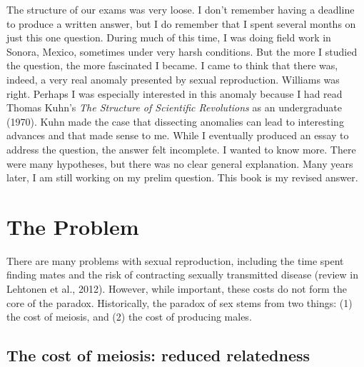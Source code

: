 \documentclass[
  letterpaper,
]{book}
\begin{document}
The structure of our exams was very loose. I don't remember having a
deadline to produce a written answer, but I do remember that I spent
several months on just this one question. During much of this time, I
was doing field work in Sonora, Mexico, sometimes under very harsh
conditions. But the more I studied the question, the more fascinated I
became. I came to think that there was, indeed, a very real anomaly
presented by sexual reproduction. Williams was right. Perhaps I was
especially interested in this anomaly because I had read Thomas Kuhn's
\emph{The Structure of Scientific Revolutions} as an undergraduate
(1970). Kuhn made the case that dissecting anomalies can lead to
interesting advances and that made sense to me. While I eventually
produced an essay to address the question, the answer felt incomplete. I
wanted to know more. There were many hypotheses, but there was no clear
general explanation. Many years later, I am still working on my prelim
question. This book is my revised answer.

\hypertarget{the-problem}{%
\section{The Problem}\label{the-problem}}

There are many problems with sexual reproduction, including the time
spent finding mates and the risk of contracting sexually transmitted
disease (review in Lehtonen et al., 2012). However, while important,
these costs do not form the core of the paradox. Historically, the
paradox of sex stems from two things: (1) the cost of meiosis, and (2)
the cost of producing males.

\hypertarget{the-cost-of-meiosis-reduced-relatedness}{%
\subsection{The cost of meiosis: reduced
relatedness}\label{the-cost-of-meiosis-reduced-relatedness}}
\end{document}
